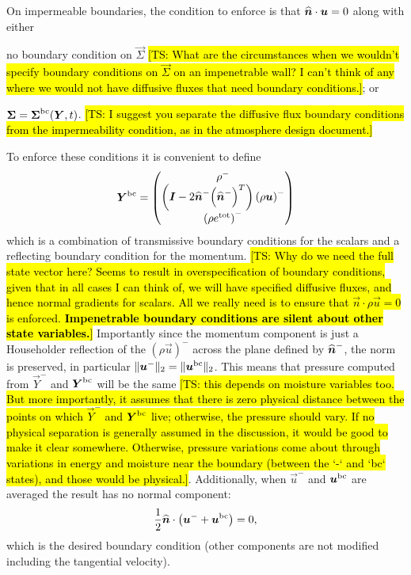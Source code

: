 \documentclass{report}
\begin{document}
On impermeable boundaries, the condition to enforce is that $\nhat
\cdot \vec{u} = 0$ along with either
\begin{enumerate*}[label = (\roman*)]
  \item no boundary condition on $\vec{\Sigma}$ \hl{[TS: What are the circumstances when we wouldn't specify boundary conditions on $\vec{\Sigma}$ on an impenetrable wall? I can't think of any where we would not have diffusive fluxes that need boundary conditions.]}; or
  \item $\vec{\Sigma} = \vec{\Sigma}^{\rm bc}(\vec{Y}, t)$. \hl{[TS: I suggest you separate the diffusive flux boundary conditions from the impermeability condition, as in the atmosphere design document.]}
\end{enumerate*}
To enforce these conditions it is convenient to define
\begin{align}
  \vec{Y}^{\rm bc}
  =
  \begin{pmatrix}
    \rho^{-}\\
    \left(\vec{I} - 2 \nhat^{-} {\left(\nhat^{-}\right)}^{T}\right)
    {\left(\rho \vec{u}\right)}^{-}\\
    {\left(\rho e^{\rm tot}\right)}^{-}
  \end{pmatrix}
\end{align}
which is a combination of transmissive boundary conditions for the scalars and a reflecting boundary condition for the momentum. \hl{[TS: Why do we need the full state vector here? Seems to result in overspecification of boundary conditions, given that in all cases I can think of, we will have specified diffusive fluxes, and hence normal gradients for scalars. All we really need is to ensure that $\vec{n} \cdot \rho \vec{u}=0$ is enforced. \textbf{Impenetrable boundary conditions are silent about other state variables.}]}
Importantly since the momentum component is just a Householder reflection of the
${\left(\rho \vec{u}\right)}^{-}$ across the plane defined by $\nhat^{-}$, the
norm is preserved, in particular $\|\vec{u}^{-}\|_{2} = \|\vec{u}^{\rm
bc}\|_{2}$. This means that pressure computed from $\vec{Y}^{-}$ and
$\vec{Y}^{\rm bc}$ will be the same \hl{[TS: this depends on moisture variables too. But more importantly, it assumes that there is zero physical distance between the points on which $\vec{Y}^{-}$ and
$\vec{Y}^{\rm bc}$ live; otherwise, the pressure should vary. If no physical separation is generally assumed in the discussion, it would be good to make it clear somewhere. Otherwise, pressure variations come about through variations in energy and moisture near the boundary (between the `-` and `bc` states), and those would be physical.]}. Additionally, when $\vec{u}^{-}$ and
$\vec{u}^{\rm bc}$ are averaged the result has no normal component:
\begin{align}
  \frac{1}{2}\nhat\cdot\left(\vec{u}^{-} + \vec{u}^{\rm bc}\right) = 0,
\end{align}
which is the desired boundary condition (other components are not modified
including the tangential velocity).
\end{document}
